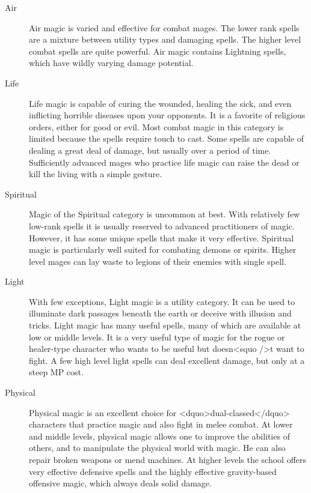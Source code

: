 \begin{description}
\item[Air] Air magic is varied and effective for combat mages.  The
  lower rank spells are a mixture between utility types and damaging
  spells.  The higher level combat spells are quite powerful.  Air
  magic contains Lightning spells, which have wildly varying damage
  potential.

\item[Life] Life magic is capable of curing the wounded, healing the
  sick, and even inflicting horrible diseases upon your opponents.  It
  is a favorite of religious orders, either for good or evil.  Most
  combat magic in this category is limited because the spells require
  touch to cast.  Some spells are capable of dealing a great deal of
  damage, but usually over a period of time.  Sufficiently advanced
  mages who practice life magic can raise the dead or kill the living
  with a simple gesture.

\item[Spiritual] Magic of the Spiritual category is uncommon at best.
  With relatively few low-rank spells it is usually reserved to
  advanced practitioners of magic.  However, it has some unique spells
  that make it very effective.  Spiritual magic is particularly well
  suited for combating demons or spirits.  Higher level mages can lay
  waste to legions of their enemies with single spell.

\item[Light] With few exceptions, Light magic is a utility category.
  It can be used to illuminate dark passages beneath the earth or
  deceive with illusion and tricks.  Light magic has many useful
  spells, many of which are available at low or middle levels.  It is
  a very useful type of magic for the rogue or healer-type character
  who wants to be useful but doesn<squo />t want to fight.  A few high level
  light spells can deal excellent damage, but only at a steep MP cost.

\item[Physical] Physical magic is an excellent choice for
  <dquo>dual-classed</dquo> characters that practice magic and also fight in
  melee combat.  At lower and middle levels, physical magic allows one
  to improve the abilities of others, and to manipulate the physical
  world with magic.  He can also repair broken weapons or mend
  machines.  At higher levels the school offers very effective
  defensive spells and the highly effective gravity-based offensive
  magic, which always deals solid damage.


\end{description}
